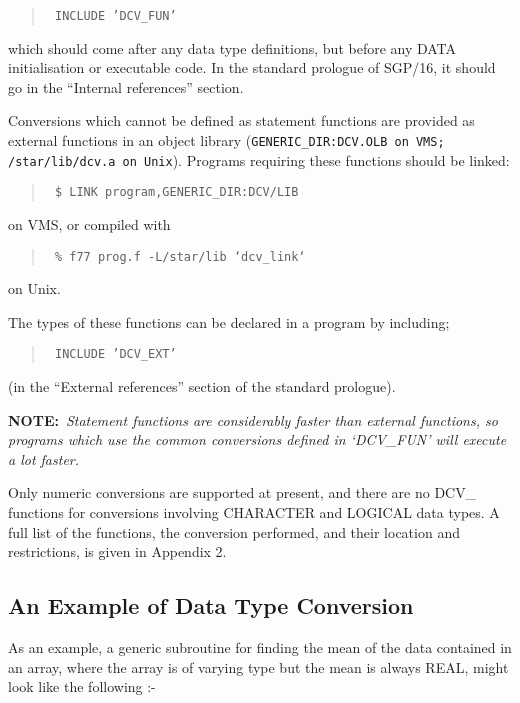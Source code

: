 \begin{quote}{\tt
INCLUDE 'DCV\_FUN'
}
\end{quote}

which should come after any data type definitions, but before
any DATA initialisation or executable code.
In the standard prologue of SGP/16, it should go in the
``Internal references'' section.

Conversions which cannot be defined as statement functions are provided as
external functions in an object library ({\tt GENERIC\_DIR:DCV.OLB on VMS;
/star/lib/dcv.a on Unix}). Programs
requiring these functions should be linked:

\begin{quote}{\tt
\$ LINK program,GENERIC\_DIR:DCV/LIB
}
\end{quote}

on VMS, or compiled with

\begin{quote}{\tt
\% f77 prog.f -L/star/lib `dcv\_link`
}
\end{quote}

on Unix.

The types of these functions can be declared in a program by including;

\begin{quote}{\tt
INCLUDE 'DCV\_EXT'
}
\end{quote}

(in the ``External references'' section of the standard prologue).

{\bf NOTE:}~{\it Statement functions are considerably faster than external 
functions, so programs which use the common conversions defined in `DCV\_FUN'
will execute a lot faster.}

Only numeric conversions are supported at present, and
there are no DCV\_ functions for conversions involving CHARACTER and
LOGICAL data types.
A full list of the functions, the conversion performed, and their
location and restrictions, is given in Appendix 2.

\subsection{An Example of Data Type Conversion}

As an example, a generic subroutine for finding the mean of the data
contained in an array, where the array is of varying type but the mean is
always REAL, might look like the following :- 

